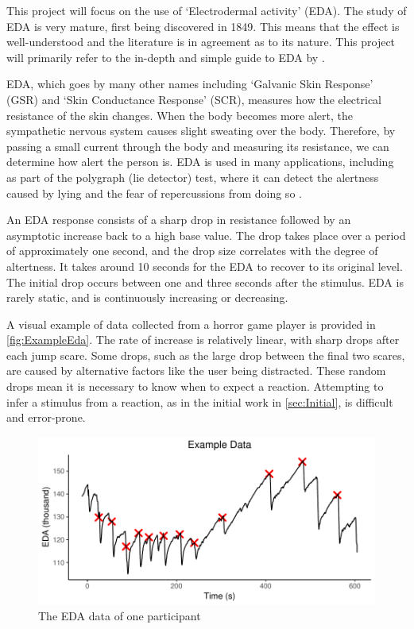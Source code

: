 \documentclass[12pt,a4paper]{article}\usepackage[]{graphicx}\usepackage[]{color}
\makeatletter
\def\maxwidth{ %
  \ifdim\Gin@nat@width>\linewidth
    \linewidth
  \else
    \Gin@nat@width
  \fi
}
\makeatother
\begin{document}
This project will focus on the use of `Electrodermal activity' (EDA).
The study of EDA is very mature, first being discovered in 1849.
This means that the effect is well-understood and the literature is in agreement as to its nature.
This project will primarily refer to the in-depth and simple guide to EDA by \citet{boucsein12}.

EDA, which goes by many other names including `Galvanic Skin Response' (GSR) and `Skin Conductance Response' (SCR), measures how the electrical resistance of the skin changes.
When the body becomes more alert, the sympathetic nervous system causes slight sweating over the body.
Therefore, by passing a small current through the body and measuring its resistance, we can determine how alert the person is.
EDA is used in many applications, including as part of the polygraph (lie detector) test, where it can detect the alertness caused by lying and the fear of repercussions from doing so \citep{polygraph}.

An EDA response consists of a sharp drop in resistance followed by an asymptotic increase back to a high base value.
The drop takes place over a period of approximately one second, and the drop size correlates with the degree of altertness.
It takes around 10 seconds for the EDA to recover to its original level.
The initial drop occurs between one and three seconds after the stimulus.
EDA is rarely static, and is continuously increasing or decreasing.

A visual example of data collected from a horror game player is provided in \vref{fig:ExampleEda}.
The rate of increase is relatively linear, with sharp drops after each jump scare.
Some drops, such as the large drop between the final two scares, are caused by alternative factors like the user being distracted.
These random drops mean it is necessary to know when to expect a reaction.
Attempting to infer a stimulus from a reaction, as in the initial work in \vref{sec:Initial}, is difficult and error-prone.

\begin{figure}[htb]


{\centering \includegraphics[width=\maxwidth]{figure/ExampleEda-1} 

}



	\caption{The EDA data of one participant}
	\label{fig:ExampleEda}
\end{figure}
\end{document}
